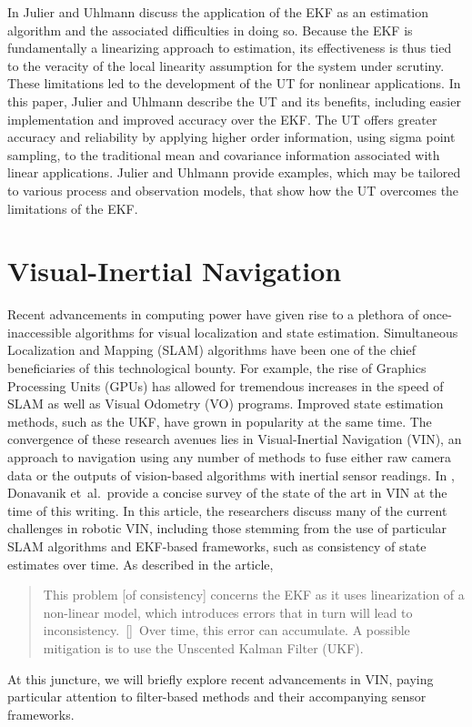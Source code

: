 In \cite{Julier2004} Julier and Uhlmann discuss the application of the EKF as an estimation algorithm and the associated difficulties in doing so. Because the EKF is fundamentally a linearizing approach to estimation, its effectiveness is thus tied to the veracity of the local linearity assumption for the system under scrutiny. These limitations led to the development of the UT for nonlinear applications. In this paper, Julier and Uhlmann describe the UT and its benefits, including easier implementation and improved accuracy over the EKF. The UT offers greater accuracy and reliability by applying higher order information, using sigma point sampling, to the traditional mean and covariance information associated with linear applications. Julier and Uhlmann provide examples, which may be tailored to various process and observation models, that show how the UT overcomes the limitations of the EKF.

\section{Visual-Inertial Navigation}

Recent advancements in computing power have given rise to a plethora of once-inaccessible algorithms for visual localization and state estimation. Simultaneous Localization and Mapping (SLAM) algorithms have been one of the chief beneficiaries of this technological bounty. For example, the rise of Graphics Processing Units (GPUs) has allowed for tremendous increases in the speed of SLAM as well as Visual Odometry (VO) programs. Improved state estimation methods, such as the UKF, have grown in popularity at the same time. The convergence of these research avenues lies in Visual-Inertial Navigation (VIN), an approach to navigation using any number of methods to fuse either raw camera data or the outputs of vision-based algorithms with inertial sensor readings. In \cite{Donavanik2016}, Donavanik et~al.\ provide a concise survey of the state of the art in VIN at the time of this writing. In this article, the researchers discuss many of the current challenges in robotic VIN, including those stemming from the use of particular SLAM algorithms and EKF-based frameworks, such as consistency of state estimates over time. As described in the article,
%
\begin{quote}
This problem [of consistency] concerns the EKF as it uses linearization of a non-linear model, which introduces errors that in turn will lead to inconsistency.\ [\textellipsis]\ Over time, this error can accumulate. A possible mitigation is to use the Unscented Kalman Filter (UKF). 
\end{quote}
%
At this juncture, we will briefly explore recent advancements in VIN, paying particular attention to filter-based methods and their accompanying sensor frameworks.

